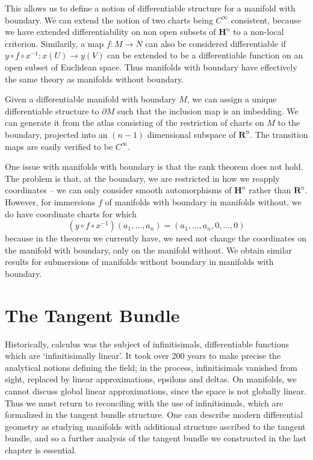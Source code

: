 This allows us to define a notion of differentiable structure for a manifold with boundary. We can extend the notion of two charts being $C^\infty$ consistent, because we have extended differentiability on non open subsets of $\mathbf{H}^n$ to a non-local criterion. Similarily, a map $f: M \to N$ can also be considered differentiable if $y \circ f \circ x^{-1}:x(U) \to y(V)$ can be extended to be a differentiable function on an open subset of Euclidean space. Thus manifolds with boundary have effectively the same theory as manifolds without boundary.

\begin{example}
    Given a differentiable manifold with boundary $M$, we can assign a unique differentiable structure to $\partial M$ such that the inclusion map is an imbedding. We can generate it from the atlas consisting of the restriction of charts on $M$ to the boundary, projected into an $(n-1)$ dimensional subspace of $\mathbf{R}^n$. The transition maps are easily verified to be $C^\infty$.
\end{example}

One issue with manifolds with boundary is that the rank theorem does not hold. The problem is that, at the boundary, we are restricted in how we reapply coordinates -- we can only consider smooth automorphisms of $\mathbf{H}^n$ rather than $\mathbf{R}^n$. However, for immersions $f$ of manifolds with boundary in manifolds without, we do have coordinate charts for which
%
\[ (y \circ f \circ x^{-1})(a_1, \dots, a_n) = (a_1, \dots, a_n, 0, \dots, 0) \]
%
because in the theorem we currently have, we need not change the coordinates on the manifold with boundary, only on the manifold without. We obtain similar results for submersions of manifolds without boundary in manifolds with boundary.




\chapter{The Tangent Bundle}

Historically, calculus was the subject of infinitisimals, differentiable functions which are `infinitisimally linear'. It took over 200 years to make precise the analytical notions defining the field; in the process, infinitisimals vanished from sight, replaced by linear approximations, epsilons and deltas. On manifolds, we cannot discuss global linear approximations, since the space is not globally linear. Thus we must return to reconciling with the use of infinitisimals, which are formalized in the tangent bundle structure. One can describe modern differential geometry as studying manifolds with additional structure ascribed to the tangent bundle, and so a further analysis of the tangent bundle we constructed in the last chapter is essential.

